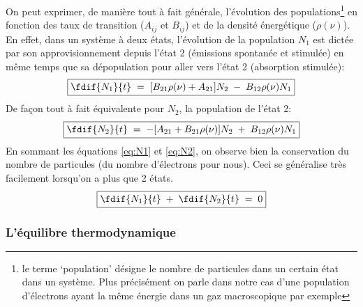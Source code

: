 On peut exprimer, de manière tout à fait générale, l'évolution des populations\footnote{le terme `population' désigne le nombre de particules dans un certain état dans un système. Plus précisément on parle dans notre cas d'une population d'électrons ayant la même énergie dans un gaz macroscopique par exemple} en fonction des taux de transition ($A_{ij}$ et $B_{ij}$) et de la densité énergétique ($\rho(\nu)$).\\
En effet, dans un système à deux états, l'évolution de la population $N_1$ est dictée par son approvisionnement depuis l'état 2 (émissions spontanée et stimulée) en même temps que sa dépopulation pour aller vers l'état 2 (absorption stimulée):
\begin{equation}
\boxed{
    \fdif{N_1}{t}
    \eq  [B_{21}\rho(\nu) + A_{21}]N_2 \;-\; B_{12} \rho(\nu)N_1
    }
    \label{eq:N2}
\end{equation}
De façon tout à fait équivalente pour $N_2$, la population de l'état 2:
\begin{equation}
\boxed{
    \fdif{N_2}{t}
    \eq - [A_{21} + B_{21} \rho(\nu)]N_2 \;+\; B_{12}\rho(\nu)N_1
    \label{eq:N1}
    }
\end{equation}
En sommant les équations \ref{eq:N1} et \ref{eq:N2}, on observe bien la conservation du nombre de particules (du nombre d'électrons pour nous). Ceci se généralise très facilement lorsqu'on a plus que 2 états.
\begin{equation}
\boxed{
    \fdif{N_1}{t}\;+\;\fdif{N_2}{t} \eq 0
    }
\end{equation}



\subsubsection{L'équilibre thermodynamique}



